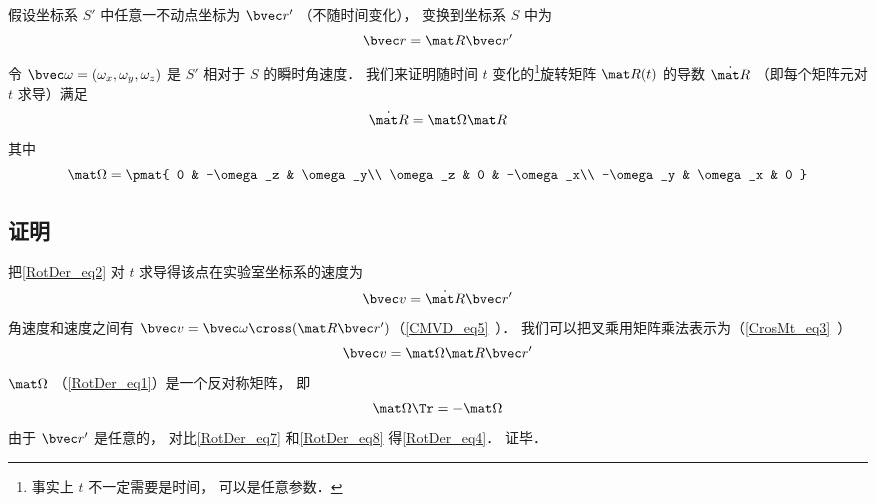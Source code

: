 

假设坐标系 $S'$ 中任意一不动点坐标为 $\bvec r'$ （不随时间变化）， 变换到坐标系 $S$ 中为
\begin{equation}\label{RotDer_eq2}
\bvec r = \mat R \bvec r'
\end{equation}
令 $\bvec\omega = (\omega_x, \omega_y, \omega_z)$ 是 $S'$ 相对于 $S$ 的瞬时角速度． 我们来证明随时间 $t$ 变化的\footnote{事实上 $t$ 不一定需要是时间， 可以是任意参数．}旋转矩阵 $\mat R(t)$ 的导数 $\dot{\mat R}$ （即每个矩阵元对 $t$ 求导）满足
\begin{equation}\label{RotDer_eq4}
\dot{\mat R} = \mat \Omega \mat R
\end{equation}
其中
\begin{equation}\label{RotDer_eq1}
\mat \Omega = \pmat{
0 & -\omega_z & \omega_y\\
\omega_z & 0 & -\omega_x\\
-\omega_y & \omega_x & 0
}
\end{equation}



\subsection{证明}
把\autoref{RotDer_eq2} 对 $t$ 求导得该点在实验室坐标系的速度为
\begin{equation}\label{RotDer_eq7}
\bvec v = \dot{\mat R} \bvec r'
\end{equation}
角速度和速度之间有 $\bvec v = \bvec \omega \cross (\mat R \bvec r')$（\autoref{CMVD_eq5}~）． 我们可以把叉乘用矩阵乘法表示为（\autoref{CrosMt_eq3}~）
\begin{equation}\label{RotDer_eq8}
\bvec v = \mat\Omega \mat R \bvec r'
\end{equation}
$\mat\Omega$ （\autoref{RotDer_eq1}）是一个反对称矩阵， 即
\begin{equation}
\mat \Omega\Tr = -\mat \Omega
\end{equation}
由于 $\bvec r'$ 是任意的， 对比\autoref{RotDer_eq7} 和\autoref{RotDer_eq8} 得\autoref{RotDer_eq4}． 证毕．
